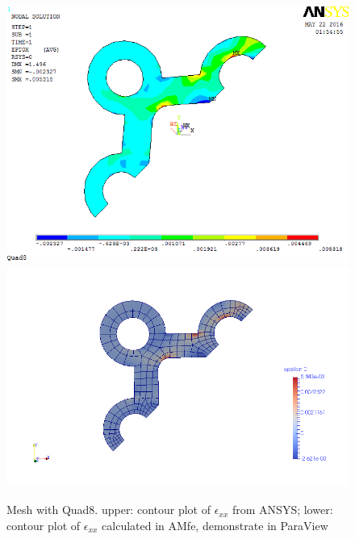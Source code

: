 \begin{figure}[htbp]
	\begin{center}
		\includegraphics[width=13cm,clip]{Quad8_Exx.png} 		
		\includegraphics[width=13cm,clip]{Quad8_Exx_P.png} 		
		\caption{Mesh with Quad8. upper: contour plot of $\epsilon_{xx}$ from ANSYS; lower: contour plot of $\epsilon_{xx}$ calculated in AMfe, demonstrate in ParaView} \label{fig: Quad8_Exx}
	\end{center}
\end{figure}
\clearpage 

